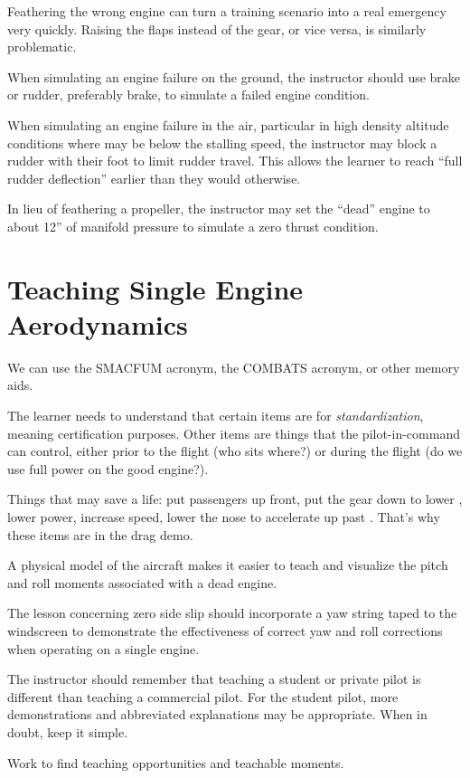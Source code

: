 {Feathering the wrong engine can turn a training scenario into a real emergency very quickly. Raising the flaps
instead of the gear, or vice versa, is similarly problematic.

When simulating an engine failure on the ground, the instructor should use brake or rudder, preferably brake,
to simulate a failed engine condition.

When simulating an engine failure in the air, particular in high density altitude conditions where \vmc may be
below the stalling speed, the instructor may block a rudder with their foot to limit rudder travel. This allows the
learner to reach ``full rudder deflection'' earlier than they would otherwise.

In lieu of feathering a propeller, the instructor may set the ``dead'' engine to about 12'' of manifold pressure
to simulate a zero thrust condition.

\section{Teaching Single Engine Aerodynamics}

We can use the SMACFUM acronym, the COMBATS acronym, or other memory aids.

The learner needs to understand that certain items are for \emph{standardization}, meaning
certification purposes. Other items are things that the pilot-in-command can control, either prior
to the flight (who sits where?) or during the flight (do we use full power on the good engine?).

Things that may save a life: put passengers up front, put the gear down to lower \vmc, lower power, increase speed, lower the nose to accelerate up past \vmc. That's why these items are in the drag demo.

A physical model of the aircraft makes it easier to teach and visualize the pitch and roll moments
associated with a dead engine.

The lesson concerning zero side slip should incorporate a yaw string taped to the windscreen to demonstrate
the effectiveness of correct yaw and roll corrections when operating on a single engine.

The instructor should remember that teaching a student or private pilot is different than teaching
a commercial pilot. For the student pilot, more demonstrations and abbreviated explanations may be
appropriate. When in doubt, keep it simple.

Work to find teaching opportunities and teachable moments.

}
